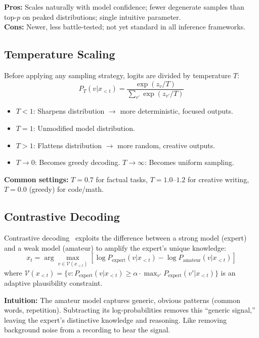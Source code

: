 \textbf{Pros:} Scales naturally with model confidence; fewer degenerate samples than top-$p$ on peaked distributions; single intuitive parameter.\\

\textbf{Cons:} Newer, less battle-tested; not yet standard in all inference frameworks.

\subsection{Temperature Scaling}
\label{temperature-scaling}

Before applying any sampling strategy, logits are divided by temperature $T$: 
\[
P_T(v | x_{<t}) = \frac{\exp(z_v / T)}{\sum_{v'} \exp(z_{v'} / T)}
\]

\begin{itemize}
  \item $T < 1$: Sharpens distribution $\to$ more deterministic, focused outputs.
  \item $T = 1$: Unmodified model distribution.
  \item $T > 1$: Flattens distribution $\to$ more random, creative outputs.
  \item $T \to 0$: Becomes greedy decoding. $T \to \infty$: Becomes uniform sampling.
\end{itemize}

\textbf{Common settings:} $T=0.7$ for factual tasks, $T=1.0$--$1.2$ for creative writing, $T=0.0$ (greedy) for code/math.

\subsection{Contrastive Decoding}
\label{contrastive-decoding}

Contrastive decoding~\cite{li2023contrastive} exploits the difference between a strong model (expert) and a weak model (amateur) to amplify the expert’s unique knowledge: 
\[
x_t = \arg\max_{v \in \mathcal{V}(x_{<t})} \left[ \log P_{\text{expert}}(v | x_{<t}) - \log P_{\text{amateur}}(v | x_{<t}) \right]
\]
 where $\mathcal{V}(x_{<t}) = \{v : P_{\text{expert}}(v | x_{<t}) \geq \alpha \cdot \max_{v'} P_{\text{expert}}(v' | x_{<t})\}$ is an adaptive plausibility constraint.

\textbf{Intuition:} The amateur model captures generic, obvious patterns (common words, repetition). Subtracting its log-probabilities removes this ``generic signal,'' leaving the expert’s distinctive knowledge and reasoning. Like removing background noise from a recording to hear the signal.

